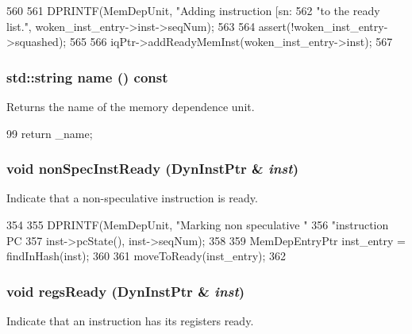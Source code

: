 \begin{DoxyCode}
560 {
561     DPRINTF(MemDepUnit, "Adding instruction [sn:%
562             "to the ready list.\n", woken_inst_entry->inst->seqNum);
563 
564     assert(!woken_inst_entry->squashed);
565 
566     iqPtr->addReadyMemInst(woken_inst_entry->inst);
567 }
\end{DoxyCode}
\hypertarget{classMemDepUnit_a37627d5d5bba7f4a8690c71c2ab3cb07}{
\subsubsection[{name}]{\setlength{\rightskip}{0pt plus 5cm}std::string name () const}}
\label{classMemDepUnit_a37627d5d5bba7f4a8690c71c2ab3cb07}
Returns the name of the memory dependence unit. 


\begin{DoxyCode}
99 { return _name; }
\end{DoxyCode}
\hypertarget{classMemDepUnit_aa85e9b95e406478a19cb070b13b89c85}{
\subsubsection[{nonSpecInstReady}]{\setlength{\rightskip}{0pt plus 5cm}void nonSpecInstReady ({\bf DynInstPtr} \& {\em inst})}}
\label{classMemDepUnit_aa85e9b95e406478a19cb070b13b89c85}
Indicate that a non-\/speculative instruction is ready. 


\begin{DoxyCode}
354 {
355     DPRINTF(MemDepUnit, "Marking non speculative "
356             "instruction PC %
357             inst->pcState(), inst->seqNum);
358 
359     MemDepEntryPtr inst_entry = findInHash(inst);
360 
361     moveToReady(inst_entry);
362 }
\end{DoxyCode}
\hypertarget{classMemDepUnit_a386af6dbeff30f5152fd5dc076143ff6}{
\subsubsection[{regsReady}]{\setlength{\rightskip}{0pt plus 5cm}void regsReady ({\bf DynInstPtr} \& {\em inst})}}
\label{classMemDepUnit_a386af6dbeff30f5152fd5dc076143ff6}
Indicate that an instruction has its registers ready. 



